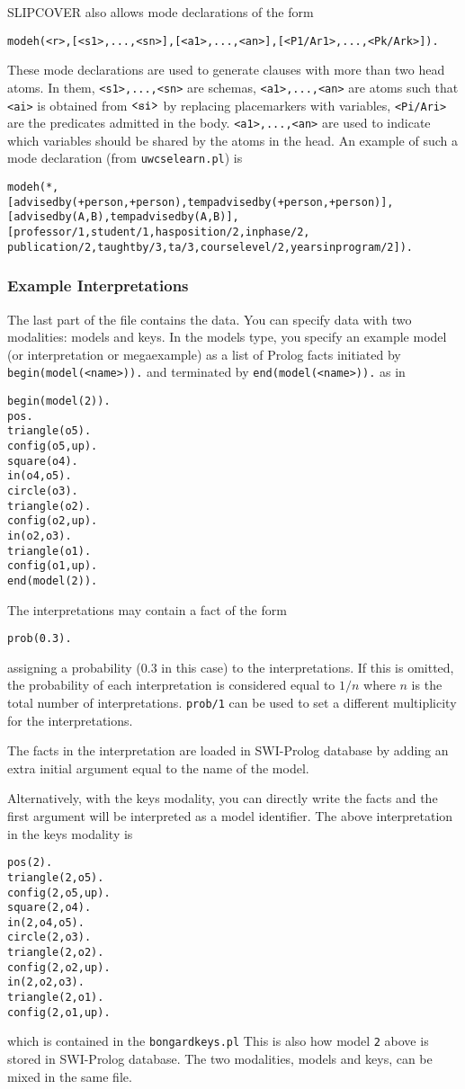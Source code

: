 \documentclass[a4paper,10pt]{article}
\begin{document}
SLIPCOVER also allows mode declarations of the form
\begin{verbatim}
modeh(<r>,[<s1>,...,<sn>],[<a1>,...,<an>],[<P1/Ar1>,...,<Pk/Ark>]). 
\end{verbatim}
These mode declarations are used to generate clauses with more than two head atoms. In them, \verb|<s1>,...,<sn>| are schemas,  \verb|<a1>,...,<an>| are atoms such that \verb|<ai>| is obtained from $\verb|<si>|$ by replacing placemarkers with variables, 
\verb|<Pi/Ari>| are the predicates admitted in the body. \verb|<a1>,...,<an>| are used to indicate which variables should be shared by the atoms in the head.
An example of such a mode declaration (from \verb|uwcselearn.pl|) is
\begin{verbatim}
modeh(*,
[advisedby(+person,+person),tempadvisedby(+person,+person)],
[advisedby(A,B),tempadvisedby(A,B)],
[professor/1,student/1,hasposition/2,inphase/2,
publication/2,taughtby/3,ta/3,courselevel/2,yearsinprogram/2]).
\end{verbatim}

\subsubsection{Example Interpretations}
The last part of the file contains the data.
You can specify data with two modalities:
models and keys.
In the models type, you specify an example model (or interpretation or megaexample) as a list of Prolog facts initiated by 
\texttt{begin(model(<name>)).} and terminated by \texttt{end(model(<name>)).} as in
\begin{verbatim}
begin(model(2)).
pos.
triangle(o5).
config(o5,up).
square(o4).
in(o4,o5).
circle(o3).
triangle(o2).
config(o2,up).
in(o2,o3).
triangle(o1).
config(o1,up).
end(model(2)).
\end{verbatim}
The interpretations may contain a fact of the form
\begin{verbatim}
prob(0.3).
\end{verbatim}
assigning a probability (0.3 in this case) to the interpretations. If this is omitted, the probability of each interpretation is considered equal to $1/n$ where $n$ is the total number of interpretations. \verb|prob/1| can be used to set a different multiplicity for the interpretations.

The facts in the interpretation are loaded in SWI-Prolog database by adding an extra initial argument equal to the name of the model.

Alternatively, with the keys modality, you can directly write the facts and the first argument will be interpreted as a model identifier. The above interpretation in the keys modality is
\begin{verbatim}
pos(2).
triangle(2,o5).
config(2,o5,up).
square(2,o4).
in(2,o4,o5).
circle(2,o3).
triangle(2,o2).
config(2,o2,up).
in(2,o2,o3).
triangle(2,o1).
config(2,o1,up).
\end{verbatim}
which is contained in the \verb|bongardkeys.pl|
This is also how model \verb|2| above is stored in SWI-Prolog database.
The two modalities, models and keys, can be mixed in the same file.
\end{document}
